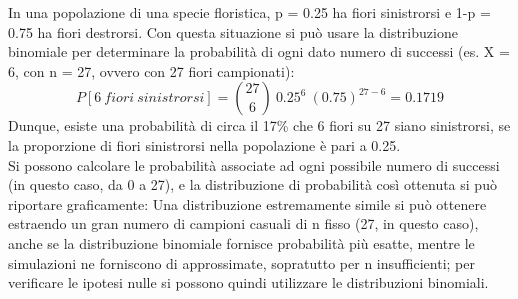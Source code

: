 \documentclass[drafts, 10pt]{book}
\newcounter{example}[section]
\begin{document}
\begin{example}
In una popolazione di una specie floristica, p = 0.25 ha fiori sinistrorsi e 1-p = 0.75 ha fiori destrorsi. Con questa situazione si può usare la distribuzione binomiale per determinare la probabilità di ogni dato numero di successi (es. X = 6, con n = 27, ovvero con 27 fiori campionati):
\begin{equation}
P[6 \ fiori \ sinistrorsi] = \binom{27}{6} \ 0.25^6 \ (0.75)^{27-6} = 0.1719
\end{equation}
Dunque, esiste una probabilità di circa il 17\% che 6 fiori su 27 siano sinistrorsi, se la proporzione di fiori sinistrorsi nella popolazione è pari a 0.25.
\\
Si possono calcolare le probabilità associate ad ogni possibile numero di successi (in questo caso, da 0 a 27), e la distribuzione di probabilità così ottenuta si può riportare graficamente:
Una distribuzione estremamente simile si può ottenere estraendo un gran numero di campioni casuali di n fisso (27, in questo caso), anche se la distribuzione binomiale fornisce probabilità più esatte, mentre le simulazioni ne forniscono di approssimate, sopratutto per n insufficienti; per verificare le ipotesi nulle si possono quindi utilizzare le distribuzioni binomiali.
\end{example}
\end{document}
